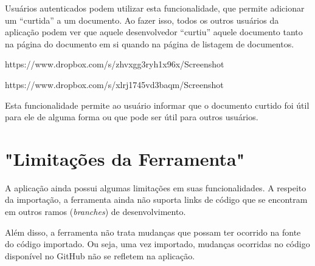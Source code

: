 Usuários autenticados podem utilizar esta funcionalidade, que permite adicionar um ``curtida'' a um documento. Ao fazer isso, todos os outros usuários da aplicação podem ver que aquele desenvolvedor ``curtiu'' aquele documento tanto na página do documento em si quando na página de listagem de documentos.

https://www.dropbox.com/s/zhvxgg3ryh1x96x/Screenshot%

https://www.dropbox.com/s/xlrj1745vd3baqm/Screenshot%

Esta funcionalidade permite ao usuário informar que o documento curtido foi útil para ele de alguma forma ou que pode ser útil para outros usuários.

\section{"Limitações da Ferramenta"}

A aplicação ainda possui algumas limitações em suas funcionalidades. A respeito da importação, a ferramenta ainda não suporta links de código que se encontram em outros ramos (\textit{branches}) de desenvolvimento.

Além disso, a ferramenta não trata mudanças que possam ter ocorrido na fonte do código importado. Ou seja, uma vez importado, mudanças ocorridas no código disponível no GitHub não se refletem na aplicação.

